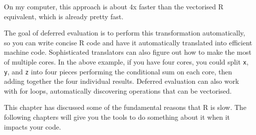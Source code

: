 On my computer, this approach is about 4x faster than the vectorised R
equivalent, which is already pretty fast.

The goal of deferred evaluation is to perform this transformation
automatically, so you can write concise R code and have it automatically
translated into efficient machine code. Sophisticated translators can
also figure out how to make the most of multiple cores. In the above
example, if you have four cores, you could split \texttt{x}, \texttt{y},
and \texttt{z} into four pieces performing the conditional sum on each
core, then adding together the four individual results. Deferred
evaluation can also work with for loops, automatically discovering
operations that can be vectorised.

This chapter has discussed some of the fundamental reasons that R is
slow. The following chapters will give you the tools to do something
about it when it impacts your code.
